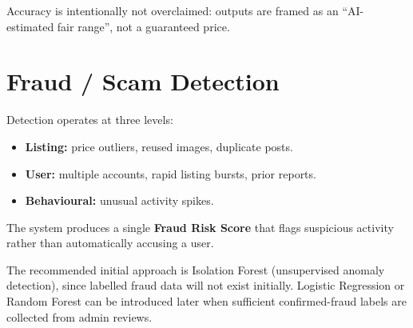 \documentclass[11pt,a4paper]{article}
\begin{document}
Accuracy is intentionally not overclaimed: outputs are framed as an ``AI-estimated fair range'', not a guaranteed price.

\section{Fraud / Scam Detection}

Detection operates at three levels:
\begin{itemize}
    \item \textbf{Listing:} price outliers, reused images, duplicate posts.
    \item \textbf{User:} multiple accounts, rapid listing bursts, prior reports.
    \item \textbf{Behavioural:} unusual activity spikes.
\end{itemize}

The system produces a single \textbf{Fraud Risk Score} that flags suspicious activity rather than automatically accusing a user.

\begin{center}
\end{center}

\begin{center}
\end{center}

The recommended initial approach is Isolation Forest (unsupervised anomaly detection), since labelled fraud data will not exist initially. Logistic Regression or Random Forest can be introduced later when sufficient confirmed-fraud labels are collected from admin reviews.
\end{document}
